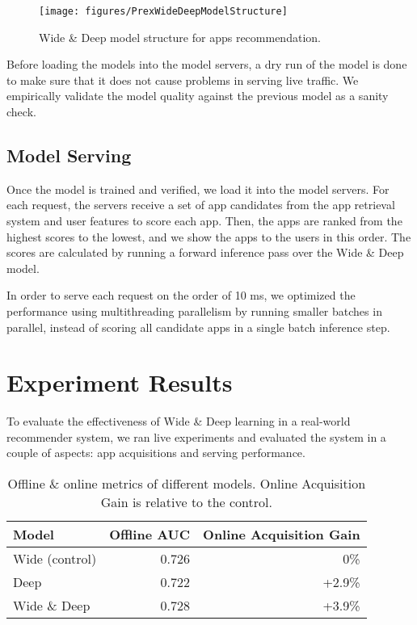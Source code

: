 \documentclass{sig-alternate-05-2015}
\begin{document}
\begin{figure}[t!]
	\centering
	\texttt{[image: figures/PrexWideDeepModelStructure]}
	\caption{Wide \& Deep model structure for apps recommendation.}
	\label{fig:PrexWideDeepModelStructure}
\end{figure}

Before loading the models into the model servers, a dry run of the model is done to make sure that it does not cause problems in serving live traffic. We empirically validate the model quality against the previous model as a sanity check.

\subsection{Model Serving}
Once the model is trained and verified, we load it into the model servers. For each request, the servers receive a set of app candidates from the app retrieval system and user features to score each app. Then, the apps are ranked from the highest scores to the lowest, and we show the apps to the users in this order. The scores are calculated by running a forward inference pass over the Wide \& Deep model.

In order to serve each request on the order of 10 ms, we optimized the performance using multithreading parallelism by running smaller batches in parallel, instead of scoring all candidate apps in a single batch inference step.

\section{Experiment Results}
To evaluate the effectiveness of Wide \& Deep learning in a real-world recommender system, we ran live experiments and evaluated the system in a couple of aspects: app acquisitions and serving performance.

\begin{table}
\caption{Offline \& online metrics of different models. Online Acquisition Gain is relative to the control.}
\label{tab:AppAcquisition}
\begin{tabular}{lrr}
\toprule
Model & Offline AUC & Online Acquisition Gain \\ \toprule
Wide (control) & 0.726 & 0\% \\ \midrule
Deep  & 0.722 &  +2.9\%  \\ \midrule
Wide \& Deep  & 0.728 & +3.9\%  \\ \bottomrule
\end{tabular}
\vspace{-13pt}
\end{table}
\end{document}
